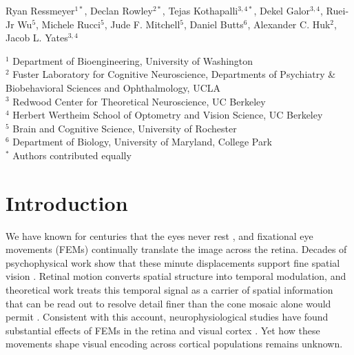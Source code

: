 \documentclass{lite}
\begin{document}
\linenumbers


\begin{center}
\vspace{-0.25em}
{\large Ryan Ressmeyer$^{1*}$, Declan Rowley$^{2*}$, Tejas Kothapalli$^{3,4*}$, Dekel Galor$^{3,4}$, Ruei-Jr Wu$^{5}$, Michele Rucci$^{5}$, Jude F. Mitchell$^{5}$, Daniel Butts$^{6}$, Alexander C. Huk$^{2}$, Jacob L. Yates$^{3,4}$\par}
\vspace{0.35em}
{\small
$^{1}$ Department of Bioengineering, University of Washington\\
$^{2}$ Fuster Laboratory for Cognitive Neuroscience, Departments of Psychiatry \& Biobehavioral Sciences and Ophthalmology, UCLA\\
$^{3}$ Redwood Center for Theoretical Neuroscience, UC Berkeley\\
$^{4}$ Herbert Wertheim School of Optometry and Vision Science, UC 
Berkeley\\
$^{5}$ Brain and Cognitive Science, University of Rochester\\
$^{6}$ Department of Biology, University of Maryland, College Park\\
$^*$ Authors contributed equally
\par}
\vspace{1em}
\end{center}



\section{Introduction}

We have known for centuries that the eyes never rest \cite{Jurin1738, martinez2017unchanging}, and fixational eye movements (FEMs) continually translate the image across the retina. Decades of psychophysical work show that these minute displacements support fine spatial vision \cite{rucci2007miniature, ratnam2017benefits, intoy2020finely}. Retinal motion converts spatial structure into temporal modulation, and theoretical work treats this temporal signal as a carrier of spatial information \cite{rucci2015unsteady, rucci2018temporal, ahissar2012seeing} that can be read out to resolve detail finer than the cone mosaic alone would permit \cite{anderson2020high}. Consistent with this account, neurophysiological studies have found substantial effects of FEMs in the retina \cite{wu2024fixational} and visual cortex \cite{baudot2013animation, mcfarland2016variability}. Yet how these movements shape visual encoding across cortical populations remains unknown.
\end{document}
